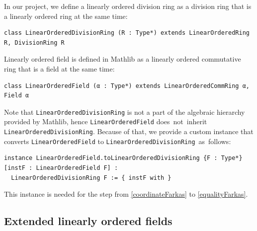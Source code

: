 \documentclass[]{article}
\renewcommand{\.}{\hskip .75pt}
\begin{document}
In our project, we define a linearly ordered division ring as a division ring that is a linearly ordered ring at the same time:
\begin{lstlisting}
class LinearOrderedDivisionRing (R : Type*) extends LinearOrderedRing R, DivisionRing R
\end{lstlisting}
Linearly ordered field is defined in Mathlib as a linearly ordered commutative ring that is a field at the same time:
\begin{lstlisting}
class LinearOrderedField (α : Type*) extends LinearOrderedCommRing α, Field α
\end{lstlisting}
Note that \texttt{LinearOrderedDivisionRing} is not a part of the algebraic hierarchy provided by Mathlib,
hence \texttt{LinearOrderedField} does~not~inherit \texttt{LinearOrderedDivisionRing}. 
Because of that, we provide a custom instance that converts
\texttt{LinearOrderedField} to \texttt{LinearOrderedDivisionRing}~as~follows:
\begin{lstlisting}
instance LinearOrderedField.toLinearOrderedDivisionRing {F : Type*} [instF : LinearOrderedField F] :
  LinearOrderedDivisionRing F := { instF with }
\end{lstlisting}
This instance is needed for the step from \ref{coordinateFarkas} to \ref{equalityFarkas}.

\subsection{Extended linearly ordered fields}
\label{preliminaries-ef}
\end{document}
